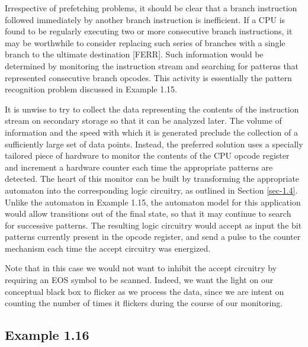 Irrespective of prefetching problems, it should be clear that a branch
instruction followed immediately by another branch instruction is inefficient.
If a CPU is found to be regularly executing two or more consecutive branch
instructions, it may be worthwhile to consider replacing such series of branches
with a single branch to the ultimate destination [FERR]. Such information would
be determined by monitoring the instruction stream and searching for patterns
that represented consecutive branch opcodes. This activity is essentially the
pattern recognition problem discussed in Example 1.15.

It is unwise to try to collect the data representing the contents of the
instruction stream on secondary storage so that it can be analyzed later. The
volume of information and the speed with which it is generated preclude the
collection of a sufficiently large set of data points. Instead, the preferred
solution uses a specially tailored piece of hardware to monitor the contents of
the CPU opcode register and increment a hardware counter each time the
appropriate patterns are detected. The heart of this monitor can be built by
transforming the appropriate automaton into the corresponding logic circuitry,
as outlined in Section \ref{sec-1.4}. Unlike the automaton in Example 1.15,
the automaton model for this application would allow transitions out of the final
state, so that it may continue to search for successive patterns. The resulting
logic circuitry would accept as input the bit patterns currently present in the
opcode register, and send a pulse to the counter mechanism each time the accept
circuitry was energized.

Note that in this case we would not want to inhibit the accept circuitry by
requiring an \<EOS\> symbol to be scanned. Indeed, we want the light on our
conceptual black box to flicker as we process the data, since we are intent on
counting the number of times it flickers during the course of our monitoring.

\subsection*{Example 1.16}


